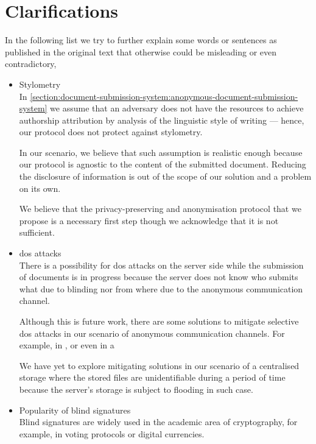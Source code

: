 

\section{Clarifications}
    \label{section:thesis:appendix:dss:clarifications}
In the following list we try to further explain some words or sentences as published 
in the original text that otherwise could be misleading or even contradictory,
\begin{itemize}
    \item Stylometry\\
    In \cref{section:document-submission-system:anonymous-document-submission-system} 
    we assume that an adversary does not have the resources to achieve authorship 
    attribution by analysis of the linguistic style of writing --- hence, our protocol 
    does not protect against stylometry.
    
    In our scenario, we believe that such assumption is realistic enough because 
    our protocol is agnostic to the content of the submitted document. Reducing 
    the disclosure of information is out of the scope of our solution and a problem 
    on its own.
    
    We believe that the privacy-preserving and anonymisation protocol that we propose 
    is a necessary first step though we acknowledge that it is not sufficient.
    
    \item \Ac{dos} attacks\\
    There is a possibility for \ac{dos} attacks on the server side while the submission 
    of documents is in progress because the server does not know who submits what 
    due to blinding nor from where due to the anonymous communication channel.
    
    Although this is future work, there are some solutions to mitigate selective 
    \ac{dos} attacks in our scenario of anonymous communication channels. For example, 
    in \cite{DasB13}, or even in \cite{JansenTJS14} a 
    
    We have yet to explore mitigating solutions in our scenario of a centralised 
    storage where the stored files are unidentifiable during a period of time because 
    the server's storage is subject to flooding in such case.
    
    \item Popularity of blind signatures\\
    Blind signatures are widely used in the academic area of cryptography, for example, 
    in voting protocols or digital currencies. 
\end{itemize}

